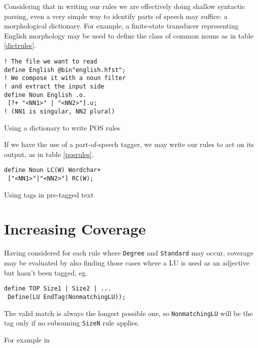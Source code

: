 \documentclass{llncs}
\begin{document}
Considering that in writing our
rules we are effectively doing shallow syntactic parsing, even a very simple
way to identify parts of speech may suffice: a morphological dictionary.
For example, a finite-state transducer representing English morphology may be
used to define the class of common nouns as in table \ref{dictrules}.

\begin{table}[h]
\small
  \begin{framed}
\begin{verbatim}
! The file we want to read
define English @bin"english.hfst";
! We compose it with a noun filter
! and extract the input side
define Noun English .o.
 [?+ "<NN1>" | "<NN2>"].u;
! (NN1 is singular, NN2 plural)
\end{verbatim}
\end{framed}
  \normalsize
  \caption{Using a dictionary to write POS rules}
  \label{dictrules}
  \end{table}

If we have the use of a part-of-speech tagger, we may write our rules to act
on its output, as in table \ref{posrules}.

\begin{table}[h]
  \small
  \begin{framed}
\begin{verbatim}
define Noun LC(W) Wordchar+
 ["<NN1>"|"<NN2>"] RC(W);
\end{verbatim}
\end{framed}
  \normalsize
  \caption{Using tags in pre-tagged text}
  \label{posrules}
  \end{table}

\section{Increasing Coverage}
Having considered for each rule where \verb+Degree+ and \verb+Standard+ may occur, coverage may be evaluated by also finding those cases where a LU is used as an adjective but hasn't been tagged, eg.

\small
\begin{verbatim}
define TOP Size1 | Size2 | ...
 Define(LU EndTag(NonmatchingLU));
\end{verbatim}
\normalsize

The valid match is always the longest possible one, so \verb+NonmatchingLU+ will be the tag only if no subsuming \verb+SizeN+ rule applies.

For example in
\end{document}
